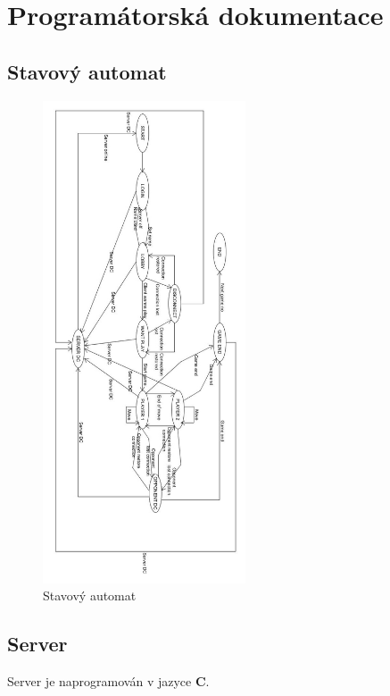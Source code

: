 \documentclass[12pt, a4paper]{article}
\begin{document}
\newpage
\section{Programátorská dokumentace}
\label{Programátorská dokumentace}
\subsection{Stavový automat}
\begin {figure}[h]
\centering
\includegraphics[width=6cm]{img/automat}
\caption{Stavový automat}
\label{fig:automat}
\end {figure}
\newpage
\subsection{Server}
\label{Server}
Server je naprogramován v jazyce \textbf{C}.
\end{document}
